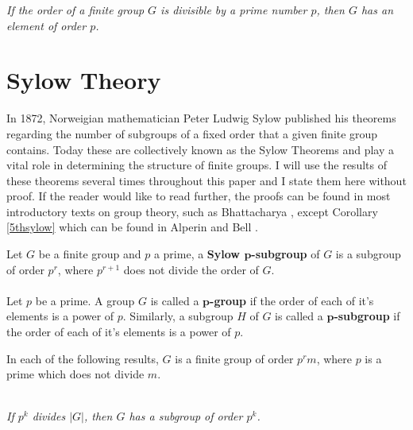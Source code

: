 \vspace{-10mm}

\begin{theorem}\label{cauchy} \textit{If the order of a finite group $G$ is divisible by a prime number $p$, then $G$ has an element of order $p$.} \\
\end{theorem} 

\section{Sylow Theory}

In 1872, Norweigian mathematician Peter Ludwig Sylow published his theorems regarding the number of subgroups of a fixed order that a given finite group contains. Today these are collectively known as the Sylow Theorems and play a vital role in determining the structure of finite groups. I will use the results of these theorems several times throughout this paper and I state them here without proof. If the reader would like to read further, the proofs can be found in most introductory texts on group theory, such as Bhattacharya \cite{bhattacharya}, except Corollary \ref{5thsylow} which can be found in Alperin and Bell \cite[p.64]{alperin} . \\


\begin{definition}
\leanok 
Let $G$ be a finite group and $p$ a prime, a \textbf{Sylow $\pmb{p}$-subgroup} of $G$ is a subgroup of order $p^r$, where $p^{r+1}$ does not divide the order of $G$. \\
\\
Let $p$ be a prime. A group $G$ is called a \textbf{$\pmb{p}$-group} if the order of each of it's elements is a power of $p$. Similarly, a subgroup $H$ of $G$ is called a \textbf{$\pmb{p}$-subgroup} if the order of each of it's elements is a power of $p$.
\end{definition}

In each of the following results, $G$ is a finite group of order $p^r m$, where $p$ is a prime which does not divide $m$. \\
\\

\begin{theorem}
\leanok
\textit{If $p^k$ divides $|G|$, then $G$ has a subgroup of order $p^k$.} \\

\end{theorem}

